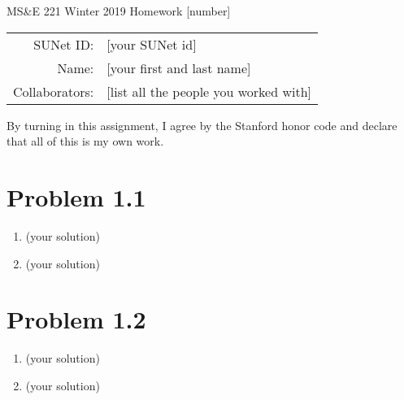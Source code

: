 \documentclass[12pt]{article}
\newcommand{\1}{\mathbb{I}} %
\begin{document}
\begin{center}
{\Large MS\&E 221 Winter 2019 Homework [number]}

\begin{tabular}{rl}
SUNet ID: & [your SUNet id] \\
Name: & [your first and last name] \\
Collaborators: & [list all the people you worked with]
\end{tabular}
\end{center}

By turning in this assignment, I agree by the Stanford honor code and declare
that all of this is my own work.

\section*{Problem 1.1}

\begin{enumerate}[label=(\alph*)]
  \item (your solution)
  \item (your solution)
\end{enumerate}

\section*{Problem 1.2}

\begin{enumerate}[label=(\alph*)]
  \item (your solution)
  \item (your solution)
\end{enumerate}
\end{document}
